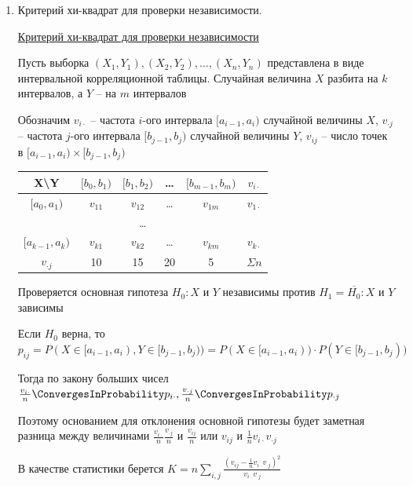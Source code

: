 \documentclass[12pt]{article}
\begin{document}
\begin{enumerate}
    \item Критерий хи-квадрат для проверки независимости.

    \hyperlink{chi_square_independence_criterion}{Критерий хи-квадрат для проверки независимости}
    
    Пусть выборка $(X_1, Y_1), (X_2, Y_2), \dots, (X_n, Y_n)$ представлена в виде интервальной корреляционной таблицы. Случайная величина $X$ 
    разбита на $k$ интервалов, а $Y$ -- на $m$ интервалов

    Обозначим $v_{i\cdot}$ -- частота $i$-ого интервала $[a_{i - 1}, a_i)$ случайной величины $X$, 
    $v_{\cdot j}$ -- частота $j$-ого интервала $[b_{j - 1}, b_j)$ случайной величины $Y$, $v_{ij}$ -- число точек в $[a_{i - 1}, a_i) \times [b_{j - 1}, b_j)$


    \begin{tabular}{c|c|c|c|c|c}
        X\backslash Y & $[b_0, b_1)$ & $[b_1, b_2)$ & \dots & $[b_{m - 1}, b_m)$ & $v_{i\cdot}$ \\
        \hline
        $[a_0, a_1)$ & $v_{11}$ & $v_{12}$ & \dots & $v_{1m}$ & $v_{1\cdot}$ \\
        \hline
        \multicolumn{6}{c}{\dots} \\
        \hline
        $[a_{k - 1}, a_k)$ & $v_{k1}$ & $v_{k2}$ & \dots & $v_{km}$ & $v_{k\cdot}$ \\
        \hline
        $v_{\cdot j}$ & 10 & 15 & 20 & 5 & $\Sigma n$ \\
    \end{tabular}

    Проверяется основная гипотеза $H_0 : X \text{ и } Y$ независимы против $H_1 = \overline{H_0} : X \text{ и } Y$ зависимы

    Если $H_0$ верна, то $p_{ij} = P(X \in [a_{i - 1}, a_i), Y \in [b_{j - 1}, b_j)) = P(X \in [a_{i - 1}, a_i)) \cdot P(Y \in [b_{j - 1}, b_j))$

    Тогда по закону больших чисел $\frac{v_{i\cdot}}{n} \ConvergesInProbability p_{i\cdot}, \frac{v_{\cdot j}}{n} \ConvergesInProbability p_{\cdot j}$

    Поэтому основанием для отклонения основной гипотезы будет заметная разница между величинами $\frac{v_{i\cdot}}{n}\frac{v_{\cdot j}}{n}$ и 
    $\frac{v_{ij}}{n}$ или $v_{ij}$ и $\frac{1}{n} v_{i\cdot} v_{\cdot j}$

    В качестве статистики берется $K = n \sum_{i, j} \frac{\left(v_{ij} - \frac{1}{n} v_{i\cdot} v_{\cdot j}\right)^2}{v_{i\cdot} v_{\cdot j}}$


\end{enumerate}
\end{document}
